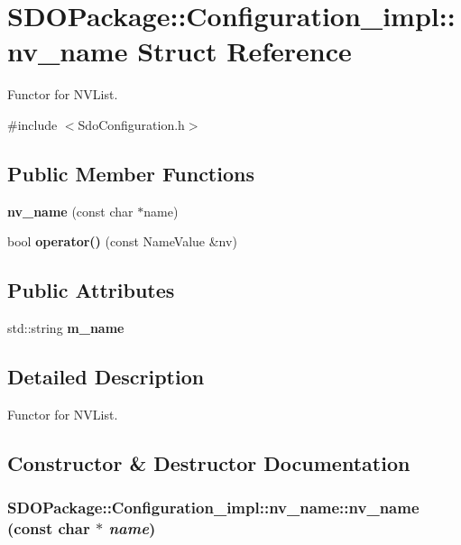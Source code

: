 \section{SDOPackage::Configuration\_\-impl::nv\_\-name Struct Reference}
\label{structSDOPackage_1_1Configuration__impl_1_1nv__name}


Functor for NVList.  




{\ttfamily \#include $<$SdoConfiguration.h$>$}

\subsection*{Public Member Functions}
\begin{DoxyCompactItemize}
\item 
{\bf nv\_\-name} (const char $\ast$name)
\item 
bool {\bf operator()} (const NameValue \&nv)
\end{DoxyCompactItemize}
\subsection*{Public Attributes}
\begin{DoxyCompactItemize}
\item 
std::string {\bf m\_\-name}
\end{DoxyCompactItemize}


\subsection{Detailed Description}
Functor for NVList. 

\subsection{Constructor \& Destructor Documentation}
\subsubsection[{nv\_\-name}]{\setlength{\rightskip}{0pt plus 5cm}SDOPackage::Configuration\_\-impl::nv\_\-name::nv\_\-name (const char $\ast$ {\em name})\hspace{0.3cm}{\ttfamily  [inline]}}\label{structSDOPackage_1_1Configuration__impl_1_1nv__name_aa16eb582dbd8ab2c40af6c6fc950fffb}


